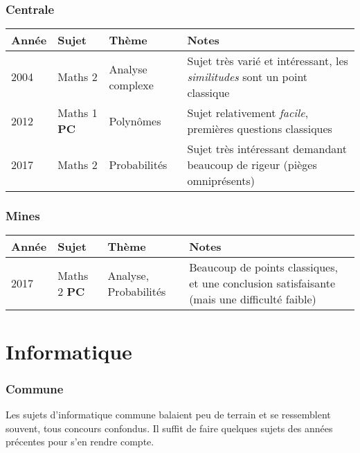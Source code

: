 \documentclass{article}
\begin{document}
\section{Centrale}

\begin{tabular}{ |p{1cm} | p{2cm} | p{3cm} | p{8cm}| }
 Année  &  Sujet            &  Thème                                &  Notes \\
\hline\hline

 2004   &  Maths 2          &  Analyse complexe                     &  Sujet très varié et intéressant, les \textit{similitudes} sont un point classique \\\hline

 2012   &  Maths 1 \textbf{PC}   &  Polynômes                            &  Sujet relativement \textit{facile}, premières questions classiques \\\hline

 2017   &  Maths 2          &  Probabilités                         &  Sujet très intéressant demandant beaucoup de rigeur (pièges omniprésents) \\\hline

\end{tabular}

\section{Mines}

\begin{tabular}{ |p{1cm} | p{2cm} | p{3cm} | p{8cm}| }
 Année  &  Sujet            &  Thème                                &  Notes \\
\hline\hline

 2017   &  Maths 2 \textbf{PC}   &  Analyse, Probabilités                &  Beaucoup de points classiques, et une conclusion satisfaisante (mais une difficulté faible) \\\hline

\end{tabular}

\part{Informatique}
\section{Commune}
Les sujets d'informatique commune balaient peu de terrain et se ressemblent souvent, tous concours confondus.
Il suffit de faire quelques sujets des années précentes pour s'en rendre compte.
\end{document}
